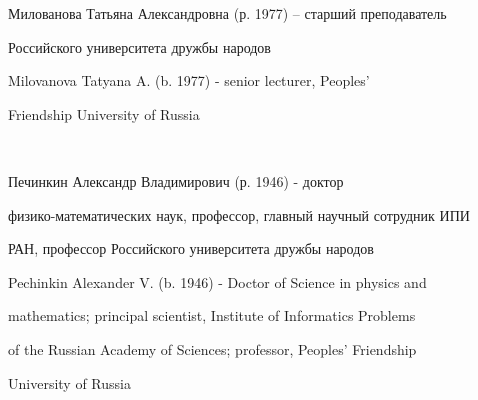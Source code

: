 Милованова Татьяна Александровна (р. 1977) -- старший преподаватель


Российского университета дружбы народов





Milovanova Tatyana A. (b. 1977) - senior lecturer, Peoples'


Friendship University of Russia





\ \





Печинкин Александр Владимирович (р. 1946) - доктор


физико-математических наук, профессор, главный научный сотрудник ИПИ


РАН, профессор Российского университета дружбы народов








Pechinkin Alexander V. (b. 1946) - Doctor of Science in physics and


mathematics; principal scientist, Institute of Informatics Problems


of the Russian Academy of Sciences; professor, Peoples' Friendship


University of Russia












